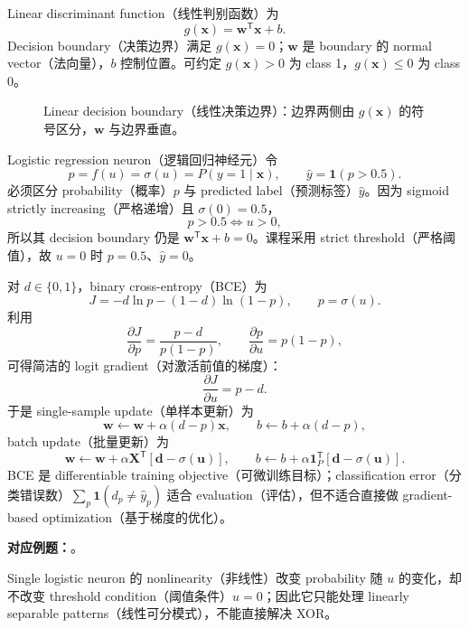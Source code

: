 
Linear discriminant function（线性判别函数）为
\[
  g(\bm x)=\bm w^{\mathsf T}\bm x+b.
\]
Decision boundary（决策边界）满足 $g(\bm x)=0$；$\bm w$ 是 boundary 的 normal vector（法向量），$b$ 控制位置。可约定 $g(\bm x)>0$ 为 class 1，$g(\bm x)\le0$ 为 class 0。

\begin{figure}[htbp]
  \centering
  \resizebox{0.78\textwidth}{!}{}
  \caption{Linear decision boundary（线性决策边界）：边界两侧由 $g(\bm x)$ 的符号区分，$\bm w$ 与边界垂直。}
  \label{fig:sc4001-l02-decision-boundary}
\end{figure}

Logistic regression neuron（逻辑回归神经元）令
\[
  p=f(u)=\sigma(u)=P(y=1\mid\bm x),\qquad
  \hat y=\mathbf 1(p>0.5).
\]
必须区分 probability（概率）$p$ 与 predicted label（预测标签）$\hat y$。因为 sigmoid strictly increasing（严格递增）且 $\sigma(0)=0.5$，
\[
  p>0.5\iff u>0,
\]
所以其 decision boundary 仍是 $\bm w^{\mathsf T}\bm x+b=0$。课程采用 strict threshold（严格阈值），故 $u=0$ 时 $p=0.5$、$\hat y=0$。

\FloatBarrier
{}

对 $d\in\{0,1\}$，binary cross-entropy（BCE）为
\[
  J=-d\ln p-(1-d)\ln(1-p),\qquad p=\sigma(u).
\]
利用
\[
  \frac{\partial J}{\partial p}=\frac{p-d}{p(1-p)},\qquad
  \frac{\partial p}{\partial u}=p(1-p),
\]
可得简洁的 logit gradient（对激活前值的梯度）：
\[
  \boxed{\frac{\partial J}{\partial u}=p-d}.
\]
于是 single-sample update（单样本更新）为
\[
  \boxed{\bm w\leftarrow\bm w+\alpha(d-p)\bm x},\qquad
  \boxed{b\leftarrow b+\alpha(d-p)},
\]
batch update（批量更新）为
\[
  \boxed{\bm w\leftarrow\bm w+\alpha\bm X^{\mathsf T}[\bm d-\sigma(\bm u)]},
  \qquad
  \boxed{b\leftarrow b+\alpha\bm 1_P^{\mathsf T}[\bm d-\sigma(\bm u)]}.
\]
BCE 是 differentiable training objective（可微训练目标）；classification error（分类错误数）$\sum_p\mathbf 1(d_p\ne\hat y_p)$ 适合 evaluation（评估），但不适合直接做 gradient-based optimization（基于梯度的优化）。

\textbf{对应例题：}。


Single logistic neuron 的 nonlinearity（非线性）改变 probability 随 $u$ 的变化，却不改变 threshold condition（阈值条件）$u=0$；因此它只能处理 linearly separable patterns（线性可分模式），不能直接解决 XOR。

